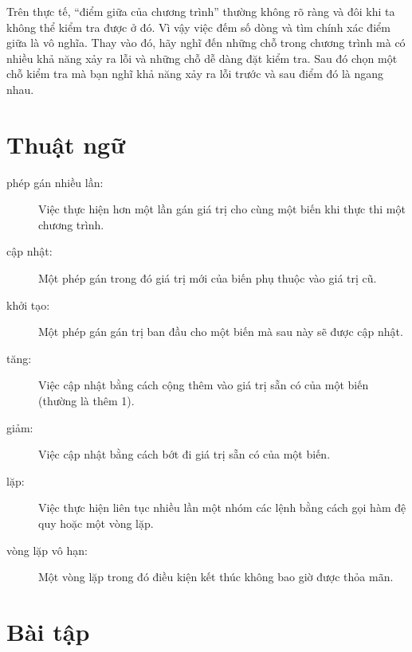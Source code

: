 \documentclass[11pt]{book}
\begin{document}
Trên thực tế, ``điểm giữa của chương trình'' thường không rõ ràng
và đôi khi ta không thể kiểm tra được ở đó. Vì vậy việc đếm số dòng và
tìm chính xác điểm giữa là vô nghĩa. Thay vào đó, hãy nghĩ đến
những chỗ trong chương trình mà có nhiều khả năng xảy ra lỗi và
những chỗ dễ dàng đặt kiểm tra. Sau đó chọn một chỗ kiểm tra mà
bạn nghĩ khả năng xảy ra lỗi trước và sau điểm đó là ngang nhau.


\section{Thuật ngữ}

\begin{description}

\item[phép gán nhiều lần:] Việc thực hiện hơn một lần gán giá trị cho
cùng một biến khi thực thi một chương trình.

\item[cập nhật:] Một phép gán trong đó giá trị mới của biến phụ thuộc
vào giá trị cũ.

\item[khởi tạo:] Một phép gán gán trị ban đầu cho một biến mà sau này
sẽ được cập nhật.

\item[tăng:] Việc cập nhật bằng cách cộng thêm vào giá trị sẵn có của một biến
(thường là thêm 1).

\item[giảm:] Việc cập nhật bằng cách bớt đi giá trị sẵn có của một biến.

\item[lặp:] Việc thực hiện liên tục nhiều lần một nhóm các lệnh bằng cách gọi
hàm đệ quy hoặc một vòng lặp.

\item[vòng lặp vô hạn:] Một vòng lặp trong đó điều kiện kết thúc không bao giờ
được thỏa mãn.

\end{description}


\section{Bài tập}
\end{document}
